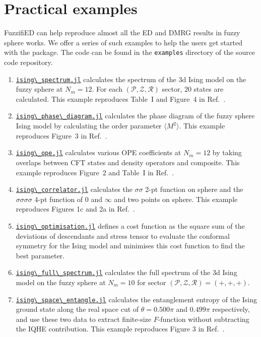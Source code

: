 \documentclass{timesjhep}
\begin{document}
\section{Practical examples}
\label{sec:examples}

FuzzifiED can help reproduce almost all the ED and DMRG results in fuzzy sphere works. We offer a series of such examples to help the users get started with the package. The code can be found in the \lstinline|examples| directory of the source code repository.

\newcommand{\linkexample}[1]{\href{https://github.com/FuzzifiED/FuzzifiED.jl/blob/main/examples/#1}{\lstinline|#1|}}

\begin{enumerate}
    \item \linkexample{ising\_spectrum.jl} calculates the spectrum of the 3d Ising model on the fuzzy sphere at $N_m = 12$. For each $(\mathcal{P},\mathcal{Z},\mathcal{R})$ sector, 20 states are calculated. This example reproduces Table~I and Figure~4 in Ref.~\cite{Zhu2022}.
    \item \linkexample{ising\_phase\_diagram.jl} calculates the phase diagram of the fuzzy sphere Ising model by calculating the order parameter $\langle M^2\rangle$. This example reproduces Figure~3 in Ref.~\cite{Zhu2022}.
    \item \linkexample{ising\_ope.jl} calculates various OPE coefficients at $N_m = 12$ by taking overlaps between CFT states and density operators and composite. This example reproduces Figure~2 and Table~I in Ref.~\cite{Hu2023Mar}.
    \item \linkexample{ising\_correlator.jl} calculates the $\sigma\sigma$ 2-pt function on sphere and the $\sigma\sigma\sigma\sigma$ 4-pt function of 0 and $\infty$ and two points on sphere. This example reproduces Figures 1c and 2a in Ref.~\cite{Han2023Jun}.
    \item \linkexample{ising\_optimisation.jl} defines a cost function as the square sum of the deviations of descendants and stress tensor to evaluate the conformal symmetry for the Ising model and minimises this cost function to find the best parameter.
    \item \linkexample{ising\_full\_spectrum.jl} calculates the full spectrum of the 3d Ising model on the fuzzy sphere at $N_m = 10$ for sector $(\mathcal{P},\mathcal{Z},\mathcal{R}) = (+,+,+)$.
    \item \linkexample{ising\_space\_entangle.jl} calculates the entanglement entropy of the Ising ground state along the real space cut of $\theta = 0.500\pi$ and $0.499\pi$ respectively, and use these two data to extract finite-size $F$-function without subtracting the IQHE contribution. This example reproduces Figure 3 in Ref.~\cite{Hu2024}.

\end{enumerate}
\end{document}
